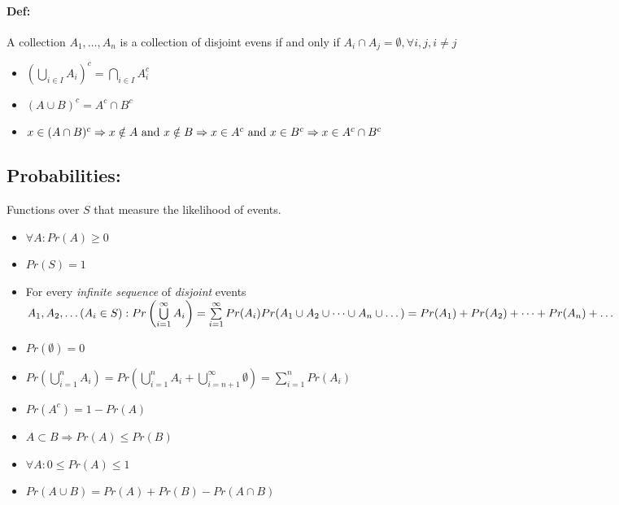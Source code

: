 \documentclass{article}
\begin{document}
\begin{multicols}{3}
        \paragraph*{Def:} A collection \(A_1, \dots, A_n\) is a collection of disjoint evens if and only if \(A_i \cap A_j = \emptyset, \forall i, j, i \neq j\)
            \begin{itemize}
                \item[] \(\left (\bigcup\limits_{i\in I} A_i \right)^c = \bigcap\limits_{i\in I}A_i^c \)
                \item[] \((A\cup B)^c = A^c \cap B^c \)
                \item[] \(x\in(A\cap B)^c \\ 
                \Rightarrow x \notin A \text{ and } x\notin B \\
                \Rightarrow x \in A^c \text{ and } x \in B^c \\
                \Rightarrow x \in A^c \cap B^c \)
            \end{itemize}
    \subsection*{Probabilities: } Functions over $S$ that measure the likelihood of events.
            \begin{itemize}
                \item[] $\forall A: Pr(A) \geq 0$
                \item[] $Pr(S) = 1$
                \item[] For every \textit{infinite sequence} of \textit{disjoint} events \( A_1, A_2, \dots (A_i \in S): \\
                Pr\left(\bigcup\limits_{i=1}^{\infty}A_i\right) = \sum\limits_{i=1}^{\infty} Pr(A_i) \\
                Pr(A_1 \cup A_2 \cup \dots \cup A_n \cup \dots) \\
                = Pr(A_1) + Pr(A_2) + \dots + Pr(A_n) + \dots \)
                \item[]\(Pr(\emptyset) = 0\)
                \item[]\(Pr(\bigcup\limits_{i=1}^{n}A_i)=Pr(\bigcup\limits_{i=1}^{n}A_i + \bigcup\limits_{i=n+1}^{\infty}\emptyset) = \sum\limits_{i=1}^{n}Pr(A_i)\)
                \item[]\(Pr(A^c) = 1-Pr(A)\)
                \item[]\(A \subset B \Rightarrow Pr(A) \leq Pr(B)\)
                \item[]\(\forall A: 0 \leq Pr(A) \leq 1\)
                \item[]\(Pr(A\cup B) = Pr(A) + Pr(B) - Pr(A\cap B)\)
            \end{itemize}

\end{multicols}
\end{document}
